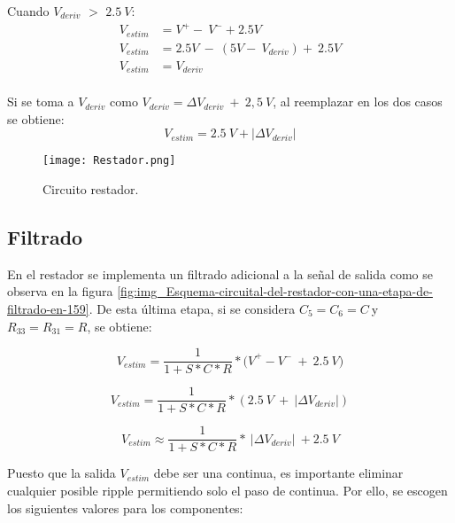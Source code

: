 \noindent Cuando $V_{deriv}$ $\mathrm{>}$ $2.5\:V$: 
\begin{equation*} 
	\begin{aligned}
		V_{estim}&=V^+-\ V^-+2.5V\\ 
		V_{estim}&=2.5V\ -\ (5V-\ V_{deriv})+\ 2.5V\\
		V_{estim}&=V_{deriv}\\
	\end{aligned}
\end{equation*}

\noindent Si se toma a $V_{deriv}$ como $V_{deriv}=\mathit{\Delta}V_{deriv}\ +\ 2,5\: V$, al reemplazar en los dos casos se obtiene:
\begin{equation} \label{eq_rest_3}
	V_{estim}= 2.5\:V + |\mathit{\Delta}V_{deriv}|
\end{equation}

\begin{figure}[H]
	\centering
	\texttt{[image: Restador.png]}
	\caption{Circuito restador.}
	\label{fig:img_Restador}
\end{figure}

\subsection{Filtrado}

\noindent En el restador se implementa un filtrado adicional a la se\~{n}al de salida como se observa en la figura  \ref{fig:img_Esquema-circuital-del-restador-con-una-etapa-de-filtrado-en-159}. De esta \'{u}ltima etapa, si se considera $C_5=C_6=C\ $y $R_{33}=R_{31}=R$, se obtiene:



\begin{equation}
	V_{estim}=\frac{1}{1+S*C*R}*{(V}^+-V^-\ +\ 2.5\:V)
\end{equation}

\begin{equation} \label{eq_Vestim_1}
	V_{estim}=\frac{1}{1+S*C*R}*(2.5\: V\ +\ |\mathit{\Delta}V_{deriv}|)
\end{equation}

\begin{equation} \label{eq_Vestim_2}
	V_{estim} \approx \frac{1}{1+S*C*R}*\ |\mathit{\Delta}V_{deriv}|\ +2.5\:V
\end{equation}



\noindent Puesto que la salida $V_{estim}$ debe ser una continua, es importante eliminar cualquier posible ripple permitiendo solo el paso de continua. Por ello, se escogen los siguientes valores para los componentes:

